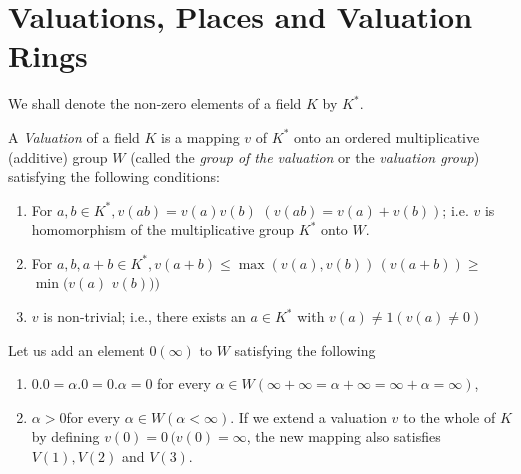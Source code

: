\section{Valuations, Places and Valuation Rings}\label{chap1:sec3}

We shall denote the non-zero elements of a field $K$ by $K^*$.
\begin{defi*}
  A {\em Valuation} of a field $K$ is a mapping $v$ of $K^*$ onto an
  ordered multiplicative (additive) group $W$ (called the {\em group
    of the valuation} or the {\em valuation group}) satisfying the
  following conditions: 
  \begin{enumerate}[\rm V(1)]
  \item For $a, b \in K^* , v(ab) = v(a)v (b)$ $(v(ab) = v(a) + v(b))$;
    i.e. $v$ is homomorphism of the multiplicative group $K^*$ onto
    $W$. 
  \item For $a , b, a+b \in K^* , v(a+b) \le \max (v(a), v(b))\, 
    (v(a+b)) \ge$ $\min (v(a)$ $v(b)))$ 
  \item $v$ is non-trivial; i.e., there exists an $a \in K^*$ with
    $v(a) \neq 1(v(a) \neq 0)$ 
  \end{enumerate}
\end{defi*}

Let us add an element $0(\infty)$ to $W$ satisfying the following 
\begin{enumerate}[(1)]
\item $0.0 = \alpha . 0 = 0. \alpha = 0$ for every $\alpha \in W
  (\infty + \infty = \alpha + \infty = \infty + \alpha = \infty)$, 
\item $\alpha >0$\pageoriginale for every $\alpha \in W (\alpha < \infty)$. If we
  extend a valuation $v$ to the whole of $K$ by defining $v(0) =
  0\,(v(0) = \infty$, the new mapping also satisfies $V(1), V(2)$ and
  $V(3)$. 
\end{enumerate}	

